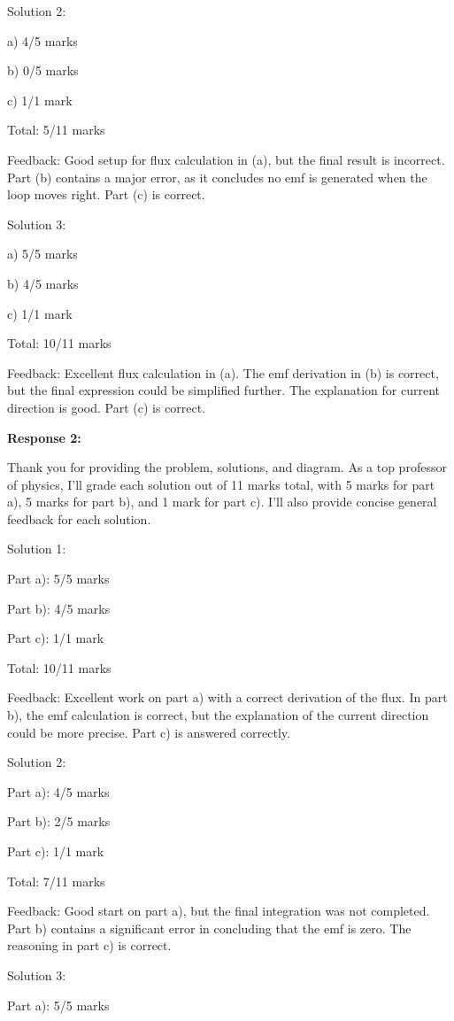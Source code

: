 \documentclass[a4paper,11pt]{article}
\begin{document}
Solution 2:

a) 4/5 marks

b) 0/5 marks

c) 1/1 mark

Total: 5/11 marks

Feedback: Good setup for flux calculation in (a), but the final result is incorrect. Part (b) contains a major error, as it concludes no emf is generated when the loop moves right. Part (c) is correct.

Solution 3:

a) 5/5 marks

b) 4/5 marks

c) 1/1 mark

Total: 10/11 marks

Feedback: Excellent flux calculation in (a). The emf derivation in (b) is correct, but the final expression could be simplified further. The explanation for current direction is good. Part (c) is correct.

\bigskip
\textbf{Response 2:}

Thank you for providing the problem, solutions, and diagram. As a top professor of physics, I'll grade each solution out of 11 marks total, with 5 marks for part a), 5 marks for part b), and 1 mark for part c). I'll also provide concise general feedback for each solution.

Solution 1:

Part a): 5/5 marks

Part b): 4/5 marks

Part c): 1/1 mark

Total: 10/11 marks

Feedback: Excellent work on part a) with a correct derivation of the flux. In part b), the emf calculation is correct, but the explanation of the current direction could be more precise. Part c) is answered correctly.

Solution 2:

Part a): 4/5 marks

Part b): 2/5 marks

Part c): 1/1 mark

Total: 7/11 marks

Feedback: Good start on part a), but the final integration was not completed. Part b) contains a significant error in concluding that the emf is zero. The reasoning in part c) is correct.

Solution 3:

Part a): 5/5 marks
\end{document}
